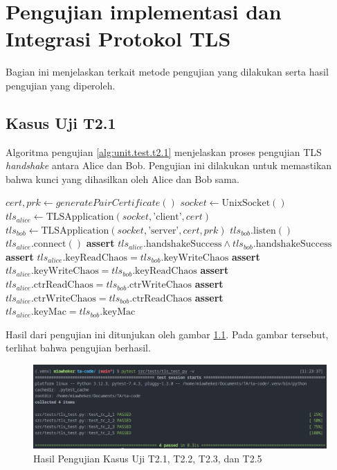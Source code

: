 \chapter{{{Pengujian implementasi dan Integrasi Protokol TLS}}} 
\label{appendix:unit.test.tls}

Bagian ini menjelaskan terkait metode pengujian yang dilakukan serta hasil pengujian yang diperoleh.

\section{Kasus Uji T2.1}

Algoritma pengujian \ref{alg:unit.test.t2.1} menjelaskan proses pengujian TLS \emph{handshake} antara Alice dan Bob. Pengujian ini dilakukan untuk memastikan bahwa kunci yang dihasilkan oleh Alice dan Bob sama.

\begin{algorithm}
  \caption{Algoritma Pengujian Kasus Uji T2.1}
  \label{alg:unit.test.t2.1}
  \begin{algorithmic}
    \State $cert, prk \gets generatePairCertificate()$
    \State $socket \gets \text{UnixSocket}()$ 
    \State $tls_{alice} \gets \text{TLSApplication}(socket, \text{'client'}, cert)$ 
    \State $tls_{bob} \gets \text{TLSApplication}(socket, \text{'server'}, cert, prk)$
    \State
    \State $tls_{bob}.\text{listen}()$  
    \State $tls_{alice}.\text{connect}()$  
    \State
    \State \textbf{assert} $tls_{alice}.\text{handshakeSuccess} \land tls_{bob}.\text{handshakeSuccess}$
    \State \textbf{assert} $tls_{alice}.\text{keyReadChaos} = tls_{bob}.\text{keyWriteChaos}$
    \State \textbf{assert} $tls_{alice}.\text{keyWriteChaos} = tls_{bob}.\text{keyReadChaos}$
    \State \textbf{assert} $tls_{alice}.\text{ctrReadChaos} = tls_{bob}.\text{ctrWriteChaos}$
    \State \textbf{assert} $tls_{alice}.\text{ctrWriteChaos} = tls_{bob}.\text{ctrReadChaos}$
    \State \textbf{assert} $tls_{alice}.\text{keyMac} = tls_{bob}.\text{keyMac}$
  \end{algorithmic}
\end{algorithm}

Hasil dari pengujian ini ditunjukan oleh gambar \ref{fig:unit.test.t2.1}. Pada gambar tersebut, terlihat bahwa pengujian berhasil.

\begin{figure}[ht]
  \centering
  \includegraphics[width=\textwidth]{chapters/res/appendix-4/tls_test.png}
  \caption{Hasil Pengujian Kasus Uji T2.1, T2.2, T2.3, dan T2.5}
  \label{fig:unit.test.t2.1}
\end{figure}

